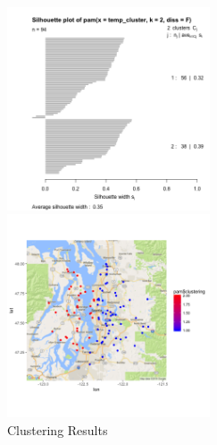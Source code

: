 \begin{figure}[h]
\centering
\begin{minipage}[t]{0.48\textwidth}
\centering
\includegraphics[width=6cm]{silhouette.png}
\end{minipage}
\begin{minipage}[t]{0.48\textwidth}
\centering
\includegraphics[width=6cm]{clustermap.png}
\end{minipage}
\caption{Clustering Results}
\label{clust}
\end{figure}